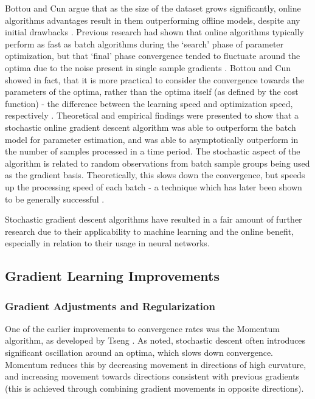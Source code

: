 \documentclass[a4paper,11pt,oneside]{article}
\theoremstyle{plain}
\theoremstyle{definition}
\begin{document}
Bottou and Cun argue that as the size of the dataset grows significantly, online algorithms advantages result in 
them outperforming offline models, despite any initial drawbacks \cite{Bottou}. Previous research had shown that online 
algorithms typically perform as fast as batch algorithms during the ‘search’ phase of parameter optimization, but 
that ‘final’ phase convergence tended to fluctuate around the optima due to the noise present in single sample 
gradients \cite{LeCun, Bottou2}. Bottou and Cun showed in fact, that it is more practical to consider the convergence towards
 the parameters of the optima, rather than the optima itself (as defined by the cost function) - the difference 
 between the learning speed and optimization speed, respectively \cite{Bottou}. Theoretical and empirical findings were 
 presented to show that a stochastic online gradient descent algorithm was able to 
 outperform the batch model for parameter estimation, and was able to asymptotically outperform in the number of 
 samples processed in a time period. The stochastic aspect of the algorithm is related to random observations 
 from batch sample groups being used as the gradient basis. Theoretically, this slows down the convergence, but 
 speeds up the processing speed of each batch - a technique which has later been shown to be generally 
 successful \cite{Shalev, Zhang}. 
 \hfill\break
 
Stochastic gradient descent algorithms have resulted in a fair amount of further research due to their applicability to machine learning 
 and the online benefit, especially in relation to their usage in neural networks.
\hfill\break

\subsection{Gradient Learning Improvements}\label{lr_grad_improv}

\subsubsection{Gradient Adjustments and Regularization}

One of the earlier improvements to convergence rates was the Momentum algorithm, as developed by Tseng \cite{Tseng}. 
As noted, stochastic descent often introduces significant oscillation around an optima, which slows down 
convergence. Momentum reduces this by decreasing movement in directions of high curvature, and  
increasing movement towards directions consistent with previous gradients (this is achieved through combining 
gradient movements in opposite directions).
\hfill\break
\end{document}
